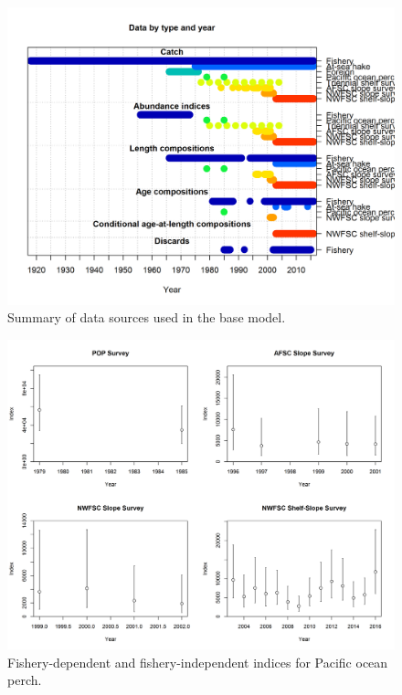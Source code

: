 \documentclass[12pt,]{article}
\begin{document}
\FloatBarrier

\begin{figure}
\centering
\includegraphics{r4ss/plots_mod1/data_plot.png}
\caption{Summary of data sources used in the base model.
\label{fig:data_plot}}
\end{figure}

\FloatBarrier

\begin{figure}
\centering
\includegraphics{Figures/Index_Data_4.png}
\caption{Fishery-dependent and fishery-independent indices for Pacific
ocean perch. \label{fig:indices}}
\end{figure}
\end{document}
